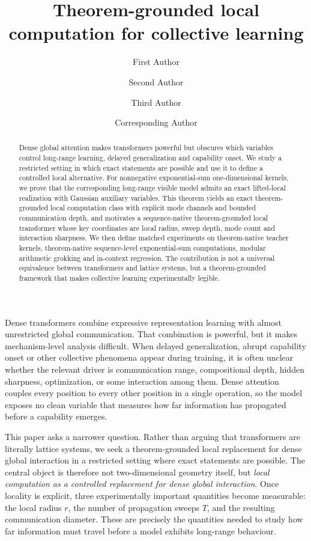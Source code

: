 \documentclass[11pt]{article}
\title{\textbf{Theorem-grounded local computation for collective learning}}
\author[1]{First Author}
\author[1]{Second Author}
\author[2]{Third Author}
\author[1,*]{Corresponding Author}
\affil[1]{Department / Institute, University, City, Country}
\affil[2]{Department / Institute, University, City, Country}
\affil[*]{Correspondence: author@email.edu}
\date{}
\theoremstyle{definition}
\begin{document}
\maketitle

\begin{abstract}
Dense global attention makes transformers powerful but obscures which variables control long-range learning, delayed generalization and capability onset. We study a restricted setting in which exact statements are possible and use it to define a controlled local alternative. For nonnegative exponential-sum one-dimensional kernels, we prove that the corresponding long-range visible model admits an exact lifted-local realization with Gaussian auxiliary variables. This theorem yields an exact theorem-grounded local computation class with explicit mode channels and bounded communication depth, and motivates a sequence-native theorem-grounded local transformer whose key coordinates are local radius, sweep depth, mode count and interaction sharpness. We then define matched experiments on theorem-native teacher kernels, theorem-native sequence-level exponential-sum computations, modular arithmetic grokking and in-context regression. The contribution is not a universal equivalence between transformers and lattice systems, but a theorem-grounded framework that makes collective learning experimentally legible.
\end{abstract}

Dense transformers combine expressive representation learning with almost unrestricted global communication. That combination is powerful, but it makes mechanism-level analysis difficult. When delayed generalization, abrupt capability onset or other collective phenomena appear during training, it is often unclear whether the relevant driver is communication range, compositional depth, hidden sharpness, optimization, or some interaction among them. Dense attention couples every position to every other position in a single operation, so the model exposes no clean variable that measures how far information has propagated before a capability emerges.

This paper asks a narrower question. Rather than arguing that transformers are literally lattice systems, we seek a theorem-grounded local replacement for dense global interaction in a restricted setting where exact statements are possible. The central object is therefore not two-dimensional geometry itself, but \emph{local computation as a controlled replacement for dense global interaction}. Once locality is explicit, three experimentally important quantities become measurable: the local radius \(r\), the number of propagation sweeps \(T\), and the resulting communication diameter. These are precisely the quantities needed to study how far information must travel before a model exhibits long-range behaviour.
\end{document}
